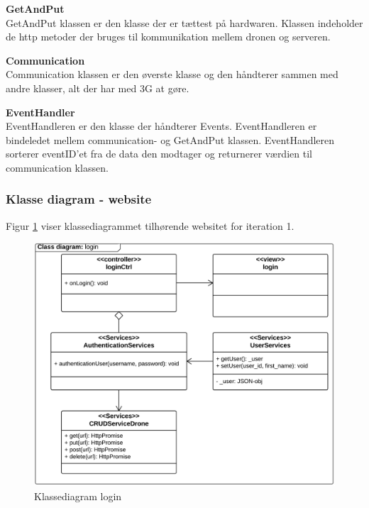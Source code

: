 \textbf{GetAndPut} \\
GetAndPut klassen er den klasse der er tættest på hardwaren. Klassen indeholder de http metoder der bruges til kommunikation mellem dronen og serveren. 

\textbf{Communication} \\
Communication klassen er den øverste klasse og den håndterer sammen med andre klasser, alt der har med 3G at gøre.

\textbf{EventHandler} \\
EventHandleren er den klasse der håndterer Events. EventHandleren er bindeledet mellem communication- og GetAndPut klassen. EventHandleren sorterer eventID'et fra de data den modtager og returnerer værdien til communication klassen. 


\newpage

\subsubsection*{Klasse diagram - website}
\vspace{-0.2cm}
Figur \ref{fig:classDiagram_login} viser klassediagrammet tilhørende websitet for iteration 1.
\vspace{-0.2cm}
\begin{figure}[H]
	\centering
	\includegraphics[width=1\textwidth]{Billeder/klasse_diagrammer/login_class_diagram.png}
	\vspace{-0.5cm}
	\caption{Klassediagram login}
	\label{fig:classDiagram_login}
\end{figure}

